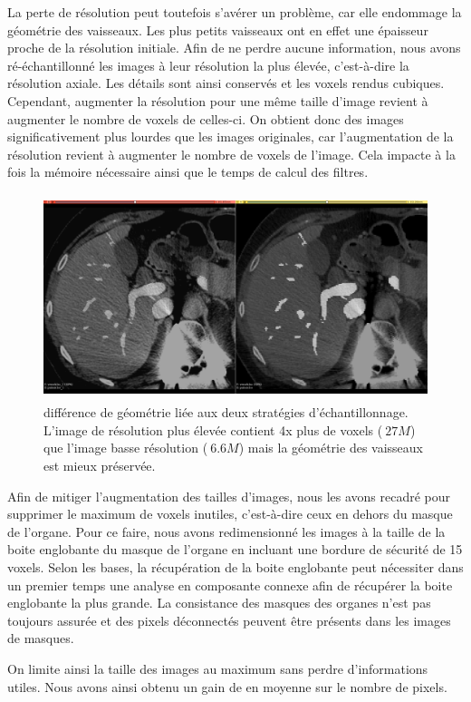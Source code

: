 La perte de résolution peut toutefois s'avérer un problème, car elle endommage la géométrie des vaisseaux. Les plus petits vaisseaux ont en effet une épaisseur proche de la résolution initiale. Afin de ne perdre aucune information, nous avons ré-échantillonné les images à leur résolution la plus élevée, c'est-à-dire la résolution axiale. Les détails sont ainsi conservés et les voxels rendus cubiques. Cependant, augmenter la résolution pour une même taille d'image revient à augmenter le nombre de voxels de celles-ci. On obtient donc des images significativement plus lourdes que les images originales, car l'augmentation de la résolution revient à augmenter le nombre de voxels de l'image. Cela impacte à la fois la mémoire nécessaire ainsi que le temps de calcul des filtres.

\begin{figure}
  \centering
  \includegraphics[height=6cm]{Images/resolution_comparison.png}
  \caption{différence de géométrie liée aux deux stratégies d'échantillonnage. L'image de résolution plus élevée contient 4x plus de voxels ($~27M$) que l'image basse résolution ($~6.6M$) mais la géométrie des vaisseaux est mieux préservée.}
\end{figure}

Afin de mitiger l'augmentation des tailles d'images, nous les avons recadré pour supprimer le maximum de voxels inutiles, c'est-à-dire ceux en dehors du masque de l'organe. Pour ce faire, nous avons redimensionné les images à la taille de la boite englobante du masque de l'organe en incluant une bordure de sécurité de 15 voxels. Selon les bases, la récupération de la boite englobante peut nécessiter dans un premier temps une analyse en composante connexe afin de récupérer la boite englobante la plus grande. La consistance des masques des organes n'est pas toujours assurée et des pixels déconnectés peuvent être présents dans les images de masques.

On limite ainsi la taille des images au maximum sans perdre d'informations utiles. Nous avons ainsi obtenu un gain de  en moyenne sur le nombre de pixels.



